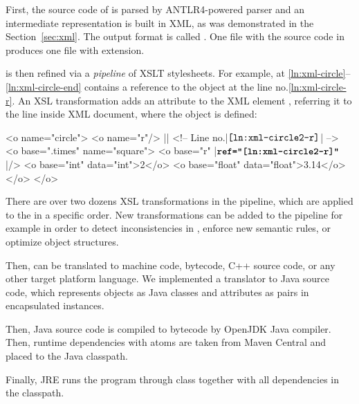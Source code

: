 First, the source code of \eo{} is parsed by ANTLR4-powered
parser and an intermediate representation is built in XML,
as was demonstrated in the Section~\ref{sec:xml}.
The output format is called \XMIR{}.
One  file with
the source code in \eo{} produces one \XMIR{} file with  extension.

\XMIR{} is then refined via a \emph{pipeline} of XSLT stylesheets.
For example, \XMIR{} at \ref{ln:xml-circle}--\ref{ln:xml-circle-end} contains a
reference to the object  at the line no.\ref{ln:xml-circle-r}.
An XSL transformation adds an attribute  to the XML element ,
referring it to the line inside XML document, where the object  is defined:

\begin{ffcode}
<o name="circle">
  <o name="r"/> |$\label{ln:xml-circle2-r}$| <!-- Line no.|$\texttt{\ref{ln:xml-circle2-r}}$| -->
  <o base=".times" name="square">
    <o base="r" |$\textbf{\texttt{ref="\ref{ln:xml-circle2-r}"}}$|/>
    <o base="int" data="int">2</o>
    <o base="float" data="float">3.14</o>
  </o>
</o>
\end{ffcode}

There are over two dozens XSL transformations in the pipeline, which
are applied to the \XMIR{} in a specific order. New transformations can
be added to the pipeline for example in order to detect inconsistencies
in \XMIR{}, enforce new semantic rules, or optimize object structures.

Then, \XMIR{} can be translated to machine code, bytecode, C++ source code,
or any other target platform language. We implemented
a translator to Java source code, which represents
\XMIR{} objects as Java classes and attributes as pairs in encapsulated
 instances.

Then, Java source code is compiled to bytecode by OpenJDK Java compiler.
Then, runtime dependencies with atoms are taken from Maven Central
and placed to the Java classpath.

Finally, JRE runs the program through  class together with
all  dependencies in the classpath.

